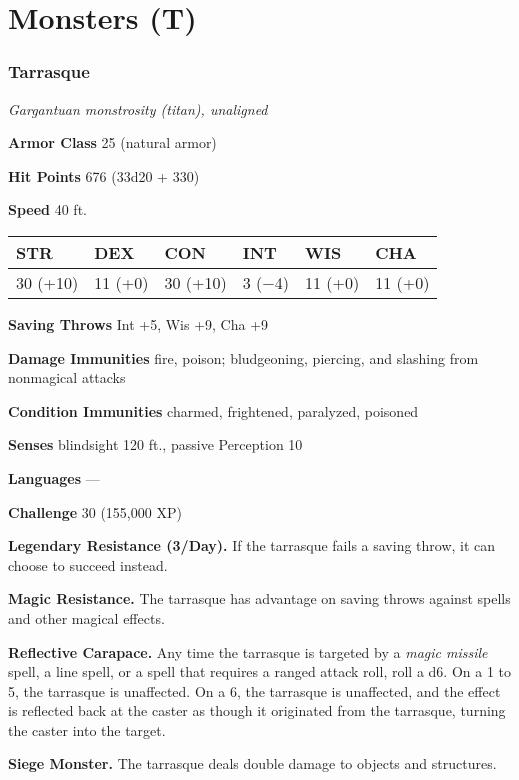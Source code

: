 \documentclass[
]{article}
\date{}
\begin{document}
\hypertarget{monsters-t}{%
\section{Monsters (T)}\label{monsters-t}}

\hypertarget{tarrasque}{%
\subsubsection{Tarrasque}\label{tarrasque}}

\emph{Gargantuan monstrosity (titan), unaligned}

\textbf{Armor Class} 25 (natural armor)

\textbf{Hit Points} 676 (33d20 + 330)

\textbf{Speed} 40 ft.

\begin{longtable}[]{@{}llllll@{}}
\toprule
STR & DEX & CON & INT & WIS & CHA\tabularnewline
\midrule
\endhead
30 (+10) & 11 (+0) & 30 (+10) & 3 (−4) & 11 (+0) & 11
(+0)\tabularnewline
\bottomrule
\end{longtable}

\textbf{Saving Throws} Int +5, Wis +9, Cha +9

\textbf{Damage Immunities} fire, poison; bludgeoning, piercing, and
slashing from nonmagical attacks

\textbf{Condition Immunities} charmed, frightened, paralyzed, poisoned

\textbf{Senses} blindsight 120 ft., passive Perception 10

\textbf{Languages} ---

\textbf{Challenge} 30 (155,000 XP)

\textbf{Legendary Resistance (3/Day).} If the tarrasque fails a saving
throw, it can choose to succeed instead.

\textbf{Magic Resistance.} The tarrasque has advantage on saving throws
against spells and other magical effects.

\textbf{Reflective Carapace.} Any time the tarrasque is targeted by a
\emph{magic missile} spell, a line spell, or a spell that requires a
ranged attack roll, roll a d6. On a 1 to 5, the tarrasque is unaffected.
On a 6, the tarrasque is unaffected, and the effect is reflected back at
the caster as though it originated from the tarrasque, turning the
caster into the target.

\textbf{Siege Monster.} The tarrasque deals double damage to objects and
structures.
\end{document}
